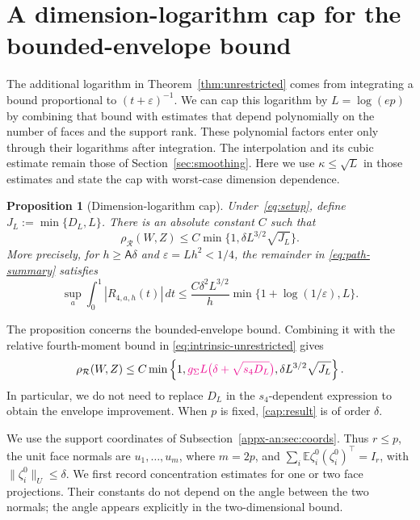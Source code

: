 \documentclass[11pt,letterpaper]{article}
\newcommand{\vSix}[1]{{\color{magenta}#1}}
\newtheorem{proposition}{Proposition}
\theoremstyle{remark}
\newcommand{\E}{\mathbb E}
\newcommand{\rh}{\rho_{\mathcal R}}
\begin{document}
\section{A dimension-logarithm cap for the bounded-envelope bound}
\label{app:dimension-cap}

The additional logarithm in Theorem~\ref{thm:unrestricted} comes from
integrating a bound proportional to \((t+\varepsilon)^{-1}\).
We can cap this logarithm by \(L=\log(ep)\) by combining that bound
with estimates that depend polynomially on the number of faces and
the support rank. These polynomial factors enter only through their
logarithms after integration. The interpolation and its cubic
estimate remain those of Section~\ref{sec:smoothing}. \vSix{Here we use
\(\kappa\le\sqrt L\) in those estimates and state the cap with
worst-case dimension dependence.}

\begin{proposition}[Dimension-logarithm cap]
\label{prop:dimension-cap}
Under~\eqref{eq:setup}, define \(J_L:=\min\{D_L,L\}\). There is an
absolute constant \(C\) such that
\begin{equation}
 \rh(W,Z)\le C\min\{1,\delta L^{3/2}\sqrt{J_L}\}.
 \label{cap:result}
\end{equation}
More precisely, for \(h\ge\mathsf A\delta\) and
\(\varepsilon=Lh^2<1/4\), the remainder in
\eqref{eq:path-summary} satisfies
\begin{equation}
 \sup_a\int_0^1|R_{4,a,h}(t)|\,dt
 \le\frac{C\delta^2L^{3/2}}h
       \min\{1+\log(1/\varepsilon),L\}.
 \label{cap:integrated}
\end{equation}
\end{proposition}

The proposition concerns the bounded-envelope bound. Combining it
with the relative fourth-moment bound in
\eqref{eq:intrinsic-unrestricted} gives
\[
 \rh(W,Z)\le C\min\left\{1,
\vSix{g_\Sigma L\bigl(\delta+\sqrt{s_4D_L}\bigr)},
 \delta L^{3/2}\sqrt{J_L}\right\}.
\]
In particular, we do not need to replace \(D_L\) in the
\(s_4\)-dependent expression to obtain the envelope improvement.
When \(p\) is fixed, \eqref{cap:result} is of order \(\delta\).

We use the support coordinates of
Subsection~\ref{appx-an:sec:coords}. Thus \(r\le p\), the unit face
normals are \(u_1,\ldots,u_m\), where \(m=2p\), and
\(\sum_i\E\zeta_i^0(\zeta_i^0)^\top=I_r\), with
\(\|\zeta_i^0\|_U\le\delta\). We first record concentration
estimates for one or two face projections. Their constants do not
depend on the angle between the two normals; the angle appears
explicitly in the two-dimensional bound.
\end{document}
